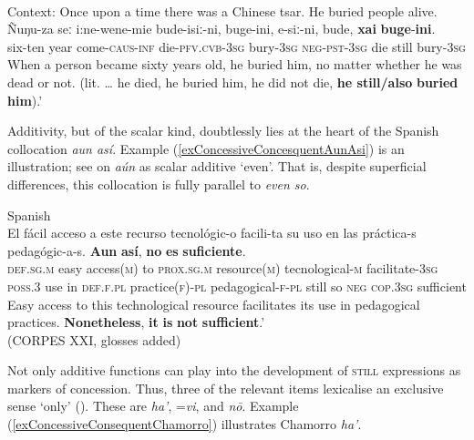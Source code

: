 \begin{exe}
	\ex {}\label{exConcessiveConsequentUdihe2}\\
	Context: Once upon a time there was a Chinese tsar. He buried people alive.\\
	\gll Ñuŋu-za seː i:ne-wene-mie bude-isiː-ni, buge-ini, e-siː-ni, bude, \textbf{xai} \textbf{buge}-\textbf{ini}.\\
	six-ten year come-\textsc{caus}-\textsc{inf} die-\textsc{pfv}.\textsc{cvb}-3\textsc{sg} bury-3\textsc{sg} \textsc{neg}-\textsc{pst}-3\textsc{sg} die still bury-3\textsc{sg}\\
	\glt When a person became sixty years old, he buried him, no matter whether he was dead or not. (lit. … he died, he buried him, he did not die, \textbf{he still}\textbf{/}\textbf{also} \textbf{buried} \textbf{him}).' \parencite[18–20]{NikolaevaEtAl2003}
\end{exe}

Additivity, but of the scalar kind, doubtlessly lies at the heart of the Spanish collocation \textit{aun así}. Example (\ref{exConcessiveConcesquentAunAsi}) is an illustration; see  on \textit{aún} as scalar additive \lq{}even\rq{}. That is, despite superficial differences, this collocation is fully parallel to  \textit{even so}.

\begin{exe}
	\ex Spanish \label{exConcessiveConcesquentAunAsi}\\
	\gll El fácil acceso a este recurso tecnológic-o facili-ta su uso en las práctica-s pedagógic-a-s. \textbf{Aun} \textbf{así}, \textbf{no} \textbf{es} \textbf{suficiente}.\\
	\textsc{def}.\textsc{sg}.\textsc{m} easy access(\textsc{m}) to \textsc{prox}.\textsc{sg}.\textsc{m} resource(\textsc{m}) tecnological-\textsc{m} facilitate-3\textsc{sg} \textsc{poss}.3 use in \textsc{def}.\textsc{f}.\textsc{pl} practice(\textsc{f})-\textsc{pl} pedagogical-\textsc{f}-\textsc{pl} still so \textsc{neg} \textsc{cop}.3\textsc{sg} sufficient\\
	\glt Easy access to this technological resource facilitates its use in pedagogical practices. \textbf{Nonetheless}, \textbf{it} \textbf{is} \textbf{not} \textbf{sufficient}.'
		\\(CORPES XXI, glosses added)		
\end{exe}

Not only additive functions can play into the development of \textsc{still} expressions as markers of concession. Thus, three of the relevant items lexicalise an exclusive sense \lq only\rq{ } (). These are  \textit{ha'},  \mbox{=\textit{vi}}, and  \textit{nō}. Example (\ref{exConcessiveConsequentChamorro}) illustrates Chamorro \textit{ha'}.

